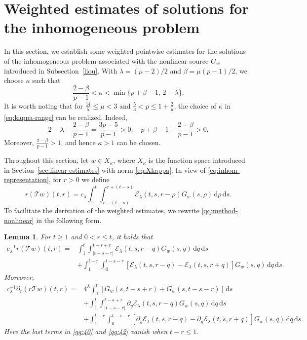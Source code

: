 \documentclass[11pt,twoside]{article}
\newcommand{\p}{\partial}
\newcommand{\f}{\frac}
\newcommand{\dd}{\,\mathrm{d}}
\newcommand{\Ecal}{\mathcal E}
\newcommand{\Tcal}{\mathcal T}
\theoremstyle{plain}
\newtheorem{lemma}[theorem]{Lemma}
\theoremstyle{definition}
\theoremstyle{remark}
\numberwithin{equation}{section}
\begin{document}
\section{Weighted estimates of solutions for the inhomogeneous problem}
\label{sec:nonlinear-Riemann-operator}

In this section, we establish some weighted pointwise estimates for the
solutions of the inhomogeneous problem
associated with the nonlinear source $G_w$
introduced in Subsection~\ref{liou}. With
$\lambda=(\mu-2)/2$ and $\beta=\mu(p-1)/2$, we choose $\kappa$ such that
\begin{equation}
\label{eq:kappa-range}
\f{2-\beta}{p-1}
<\kappa
<\min\{p+\beta-1,\,2-\lambda\}.
\end{equation}
It is worth noting that for
$\f{14}{5}\leq\mu<3$ and
$\f{5}{3}<p\leq1+\f{2}{\mu}$, the choice of $\kappa$ in
\eqref{eq:kappa-range} can be realized. Indeed,
\[
2-\lambda-\f{2-\beta}{p-1}
=\f{3p-5}{p-1}>0,
\quad
p+\beta-1-\f{2-\beta}{p-1}>0.
\]
Moreover, $\f{2-\beta}{p-1}>1$, and hence $\kappa>1$ can be chosen.

Throughout this section, let $w\in X_\kappa$, where $X_\kappa$ is
the function space introduced in Section~\ref{sec:linear-estimates}
with norm \eqref{eq:Xkappa}. In view of \eqref{eq:inhom-representation}, for $r>0$ we define
\begin{equation}
\label{qq:method-nonlinear}
r(\Tcal w)(t,r)
=c_\lambda
\int_1^t
\int_{r-(t-s)}^{r+(t-s)}
\Ecal_\lambda(t,s,r-\rho)
G_w(s,\rho)\dd\rho\dd s.
\end{equation}
To facilitate the derivation of the weighted estimates, we rewrite
\eqref{qq:method-nonlinear} in the following form.

\begin{lemma}
\label{lem:nonlinear-representation}
For $t\geq1$ and $0<r\leq t$, it holds that
\begin{equation}
\label{qq:40}
\begin{aligned}
c_\lambda^{-1}r(\Tcal w)(t,r)
={}&
\int_1^t
\int_{|t-s-r|}^{t-s+r}
\Ecal_\lambda(t,s,r-q)
G_w(s,q)\dd q\dd s\\
&+\int_1^{t-r}
\int_0^{t-s-r}
\left[
\Ecal_\lambda(t,s,r-q)
-\Ecal_\lambda(t,s,r+q)
\right]
G_w(s,q)\dd q\dd s.
\end{aligned}
\end{equation}
Moreover,
\begin{equation}
\label{qq:42}
\begin{aligned}
c_\lambda^{-1}\p_r(r\Tcal w)(t,r)
={}&
4^\lambda
\int_1^t
\left[
G_w(s,t-s+r)
+G_w(s,t-s-r)
\right]\dd s\\
&+\int_1^t
\int_{|t-s-r|}^{t-s+r}
\p_y\Ecal_\lambda(t,s,r-q)
G_w(s,q)\dd q\dd s\\
&+\int_1^{t-r}
\int_0^{t-s-r}
\left[
\p_y\Ecal_\lambda(t,s,r-q)
-\p_y\Ecal_\lambda(t,s,r+q)
\right]
G_w(s,q)\dd q\dd s.
\end{aligned}
\end{equation}
Here the last terms in
\eqref{qq:40} and \eqref{qq:42} vanish when $t-r\leq1$.
\end{lemma}
\end{document}
